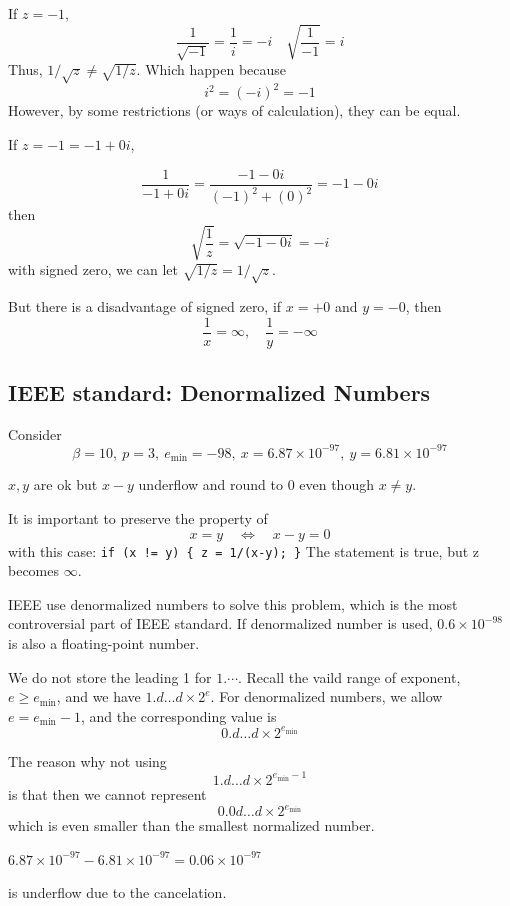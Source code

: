 If $z = -1$, \[
    \frac{1}{\sqrt{-1}} = \frac{1}{i} = -i \quad \sqrt{\frac{1}{-1}} = i
\]
Thus, $1/\sqrt{z} \neq \sqrt{1/z}$. Which happen because \[
    i^2 = (-i)^2 = -1
\]
However, by some restrictions (or ways of calculation), they can be equal.

If $z = -1 = -1 + 0i$,

$$
\frac{1}{-1 + 0i} = \frac{-1 - 0i}{(-1)^2 + (0)^2} = -1 - 0i
$$
then \[
    \sqrt{\frac{1}{z}} = \sqrt{-1 - 0i} = -i
\]
with signed zero, we can let $\sqrt{1/z} = 1/\sqrt{z}$.

But there is a disadvantage of signed zero, if $x = +0$ and $y = -0$, then \[
    \frac{1}{x} = \infty, \quad \frac{1}{y} = -\infty
\]

\newpage

\subsection{IEEE standard: Denormalized Numbers}

\begin{eg}
    Consider
    \[
        \beta = 10,\ p = 3,\ e_{\min} = -98,\ x = 6.87 \times 10^{-97},\ y = 6.81 \times 10^{-97}
    \]
\end{eg}

$x,y$ are ok but $x-y$ underflow and round to 0 even though $x \neq y$.

\begin{note}
    It is important to preserve the property of \[
        x = y \quad \iff \quad x-y = 0
    \]
    with this case: \texttt{if (x != y) \{ z = 1/(x-y); \}}
    The statement is true, but z becomes $\infty$.
\end{note}
\vspace{1em}

IEEE use denormalized numbers to solve this problem, which is the most controversial part of IEEE standard. If denormalized number is used, $0.6 \times 10^{-98}$ is also a floating-point number.
\vspace{0.5em}

We do not store the leading 1 for $1.\cdots$. Recall the vaild range of exponent, $e \ge e_{\min}$, and we have $1.d\ldots d\times 2^{e}$. For denormalized numbers, we allow $e = e_{\min} - 1$, and the corresponding value is \[
    0.d\ldots d \times 2^{e_{\min}}
\]

\begin{remark}
    The reason why not using \[
        1.d\ldots d \times 2^{e_{\min}-1}
    \]
    is that then we cannot represent \[
        0.0d\ldots d \times 2^{e_{\min}}
    \]
    which is even smaller than the smallest normalized number.
    \begin{eg}
        $6.87 \times 10^{-97} - 6.81 \times 10^{-97} = 0.06 \times 10^{-97}$
    \end{eg}
    is underflow due to the cancelation.
\end{remark}
\vspace{1em}

